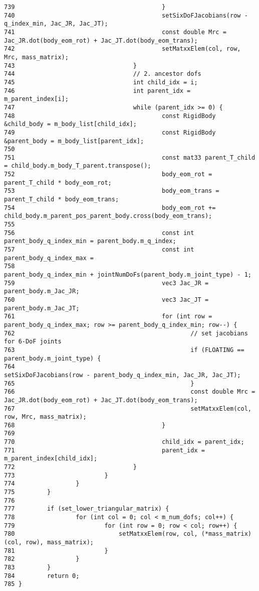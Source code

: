 \begin{Code}
\begin{verbatim}
739                                         }
740                                         setSixDoFJacobians(row - q_index_min, Jac_JR, Jac_JT);
741                                         const double Mrc = Jac_JR.dot(body_eom_rot) + Jac_JT.dot(body_eom_trans);
742                                         setMatxxElem(col, row, Mrc, mass_matrix);
743                                 }
744                                 // 2. ancestor dofs
745                                 int child_idx = i;
746                                 int parent_idx = m_parent_index[i];
747                                 while (parent_idx >= 0) {
748                                         const RigidBody &child_body = m_body_list[child_idx];
749                                         const RigidBody &parent_body = m_body_list[parent_idx];
750 
751                                         const mat33 parent_T_child = child_body.m_body_T_parent.transpose();
752                                         body_eom_rot = parent_T_child * body_eom_rot;
753                                         body_eom_trans = parent_T_child * body_eom_trans;
754                                         body_eom_rot += child_body.m_parent_pos_parent_body.cross(body_eom_trans);
755 
756                                         const int parent_body_q_index_min = parent_body.m_q_index;
757                                         const int parent_body_q_index_max =
758                                                 parent_body_q_index_min + jointNumDoFs(parent_body.m_joint_type) - 1;
759                                         vec3 Jac_JR = parent_body.m_Jac_JR;
760                                         vec3 Jac_JT = parent_body.m_Jac_JT;
761                                         for (int row = parent_body_q_index_max; row >= parent_body_q_index_min; row--) {
762                                                 // set jacobians for 6-DoF joints
763                                                 if (FLOATING == parent_body.m_joint_type) {
764                                                         setSixDoFJacobians(row - parent_body_q_index_min, Jac_JR, Jac_JT);
765                                                 }
766                                                 const double Mrc = Jac_JR.dot(body_eom_rot) + Jac_JT.dot(body_eom_trans);
767                                                 setMatxxElem(col, row, Mrc, mass_matrix);
768                                         }
769 
770                                         child_idx = parent_idx;
771                                         parent_idx = m_parent_index[child_idx];
772                                 }
773                         }
774                 }
775         }
776 
777         if (set_lower_triangular_matrix) {
778                 for (int col = 0; col < m_num_dofs; col++) {
779                         for (int row = 0; row < col; row++) {
780                             setMatxxElem(row, col, (*mass_matrix)(col, row), mass_matrix);
781                         }
782                 }
783         }
784         return 0;
785 }
\end{verbatim}
\end{Code}




